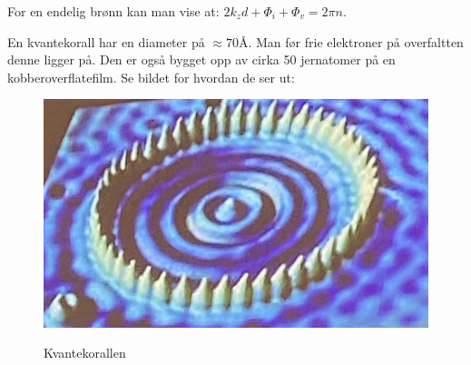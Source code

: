 \documentclass{article}
\begin{document}
For en endelig brønn kan man vise at: $2k_z d + \Phi_i + \Phi_v = 2\pi n$.

En kvantekorall har en diameter på $\approx 70 Å$. Man før frie elektroner på overfaltten denne ligger på. Den er også bygget opp av cirka 50 jernatomer på en kobberoverflatefilm. Se bildet for hvordan de ser ut:
\begin{figure}[h]
  \centering
  \caption{Kvantekorallen}
  \includegraphics[scale=0.4]{bilder/kvantekorallen.jpg}
  \label{fig:kvantekorallen}
\end{figure}
\end{document}
